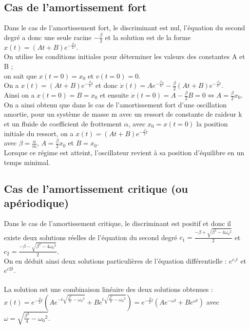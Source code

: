\documentclass[a4paper,10pt]{book}
\begin{document}
\subsection{Cas de l'amortissement fort}
Dans le cas de l'amortissement fort, le discriminant est nul, l'équation du second degré a donc une seule racine $-\frac{\beta}{2}$ et la solution est de la forme $x(t)=(At+B)e^{-\frac{\beta}{2}t}$.\\

On utilise les conditions initiales pour déterminer les valeurs des constantes A et B ;\\
on sait que $x(t=0)=x_{0}$ et $v(t=0)=0$.\\

On a $x(t)=(At+B)e^{-\frac{\beta}{2}t}$ et donc $\dot{x}(t)=Ae^{-\frac{\beta}{2}t}-\frac{\beta}{2}(At+B)e^{-\frac{\beta}{2}t}$.\\

Ainsi on a $x(t=0)=B=x_{0}$ et ensuite $\dot{x}(t=0)=A-\frac{\beta}{2}B=0 \Leftrightarrow A=\frac{\beta}{2}x_{0}$.\\

On a ainsi obtenu que dans le cas de l’amortissement fort d’une oscillation amortie, pour un système de masse m avec un ressort de constante de raideur k et un fluide de coefficient de frottement $\alpha$, avec $x_{0}=x(t=0)$ la position initiale du ressort, on a $x(t)=(At+B)e^{-\frac{\beta}{2}t}$\\
avec $\beta=\frac{\alpha}{m}$, $A=\frac{\beta}{2}x_{0}$ et $B=x_{0}$.\\

Lorsque ce régime est atteint, l'oscillateur revient à sa position d'équilibre en un temps minimal.

\subsection{Cas de l'amortissement critique (ou apériodique)}
Dans le cas de l'amortissement critique, le discriminant est positif et donc il existe deux solutions réelles
de l'équation du second degré $c_{1}=\frac{-\beta +\sqrt{\beta^{2}-4\omega_{0}{}^{2}}}{2}$ et $c_{2}=\frac{-\beta -\sqrt{\beta^{2}-4\omega_{0}{}^{2}}}{2}$.\\

On en déduit ainsi deux solutions particulières de l'équation différentielle : $e^{c_{1}t}$ et $e^{c{2}t}$.\\\\
La solution est une combinaison linéaire des deux solutions obtenues :\\
$x(t)=e^{-\frac{\beta}{2}t}(Ae^{-t\sqrt{\frac{\beta^{2}}{4}-\omega_{0}{}^{2}}}+Be^{t\sqrt{\frac{\beta^{2}}{4}-\omega_{0}{}^{2}}})=e^{-\frac{\beta}{2}t}(Ae^{-\omega t}+Be^{\omega t})$ avec $\omega=\sqrt{\frac{\beta^{2}}{4}-\omega_{0}{}^{2}}$.\\
\end{document}
